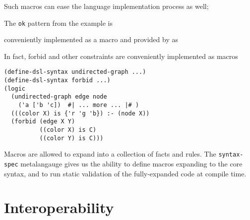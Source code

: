 \documentclass[dvipsnames,sigplan,screen,review,anonymous,acmthm,nonacm]{acmart}
\begin{document}
Such macros can ease the language implementation process as well;

The \texttt{ok} pattern from the example is 

conveniently implemented as a
macro and provided by \miniDusa{} as 

In fact, forbid and other constraints are conveniently implemented as macros

\begin{verbatim}
(define-dsl-syntax undirected-graph ...)
(define-dsl-syntax forbid ...)
(logic
  (undirected-graph edge node
    ('a ['b 'c])  #| ... more ... |# )
  (((color X) is {'r 'g 'b}) :- (node X))
  (forbid (edge X Y)
          ((color X) is C)
          ((color Y) is C)))
\end{verbatim}

Macros are allowed to expand into a collection of facts and rules. The
\texttt{syntax-spec} metalangauge gives us the ability to define macros
expanding to the core syntax, and to run static validation of the fully-expanded
code at compile time. 


\begin{center}
\end{center}

\section{Interoperability}
\end{document}

